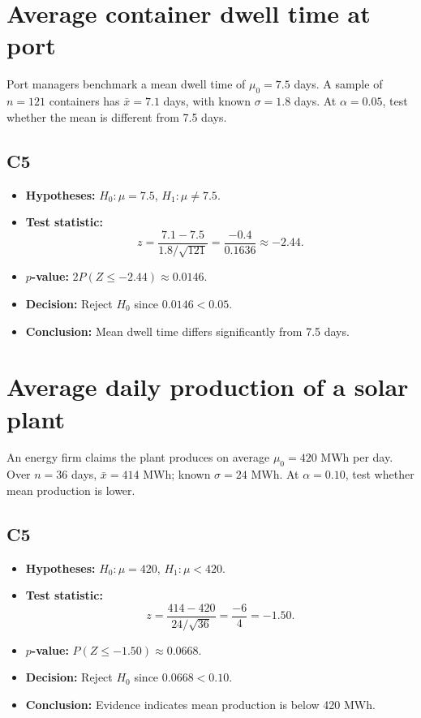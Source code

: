 \begin{ExamProblems}
\item
\section{Average container dwell time at port}
Port managers benchmark a mean dwell time of \(\mu_0=7.5\) days. A sample of \(n=121\) containers has \(\bar x=7.1\) days, with known \(\sigma=1.8\) days. At \(\alpha=0.05\), test whether the mean is different from 7.5 days.

\subsection*{C5}
\begin{itemize}
    \item \textbf{Hypotheses:} \(H_0\colon \mu=7.5\), \(H_1\colon \mu\ne 7.5\).
    \item \textbf{Test statistic:}
    \[
    z=\frac{7.1-7.5}{1.8/\sqrt{121}}=\frac{-0.4}{0.1636}\approx -2.44.
    \]
    \item \textbf{\(p\)-value:} \(2P(Z\le -2.44)\approx 0.0146\).
    \item \textbf{Decision:} Reject \(H_0\) since \(0.0146<0.05\).
    \item \textbf{Conclusion:} Mean dwell time differs significantly from 7.5 days.
\end{itemize}

\item
\section{Average daily production of a solar plant}
An energy firm claims the plant produces on average \(\mu_0=420\) MWh per day. Over \(n=36\) days, \(\bar x=414\) MWh; known \(\sigma=24\) MWh. At \(\alpha=0.10\), test whether mean production is lower.

\subsection*{C5}
\begin{itemize}
    \item \textbf{Hypotheses:} \(H_0\colon \mu=420\), \(H_1\colon \mu<420\).
    \item \textbf{Test statistic:}
    \[
    z=\frac{414-420}{24/\sqrt{36}}=\frac{-6}{4}=-1.50.
    \]
    \item \textbf{\(p\)-value:} \(P(Z\le -1.50)\approx 0.0668\).
    \item \textbf{Decision:} Reject \(H_0\) since \(0.0668<0.10\).
    \item \textbf{Conclusion:} Evidence indicates mean production is below 420 MWh.
\end{itemize}


\end{ExamProblems}
